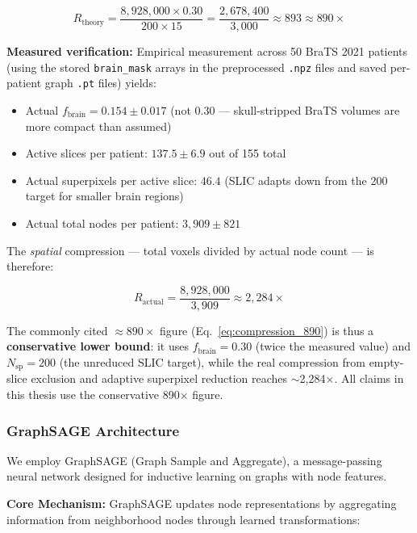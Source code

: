 \begin{equation}
R_{\text{theory}} = \frac{8{,}928{,}000 \times 0.30}{200 \times 15} = \frac{2{,}678{,}400}{3{,}000} \approx 893 \approx 890\times
\label{eq:compression_890}
\end{equation}

\textbf{Measured verification:} Empirical measurement across 50 BraTS 2021 patients (using the stored \texttt{brain\_mask} arrays in the preprocessed \texttt{.npz} files and saved per-patient graph \texttt{.pt} files) yields:

\begin{itemize}
\item Actual $f_{\text{brain}} = 0.154 \pm 0.017$ (not 0.30 — skull-stripped BraTS volumes are more compact than assumed)
\item Active slices per patient: $137.5 \pm 6.9$ out of 155 total
\item Actual superpixels per active slice: $46.4$ (SLIC adapts down from the 200 target for smaller brain regions)
\item Actual total nodes per patient: $3{,}909 \pm 821$
\end{itemize}

The \textit{spatial} compression — total voxels divided by actual node count — is therefore:

\begin{equation}
R_{\text{actual}} = \frac{8{,}928{,}000}{3{,}909} \approx 2{,}284\times
\label{eq:compression_actual}
\end{equation}

The commonly cited $\approx 890\times$ figure (Eq.~\ref{eq:compression_890}) is thus a \textbf{conservative lower bound}: it uses $f_{\text{brain}} = 0.30$ (twice the measured value) and $N_{\text{sp}} = 200$ (the unreduced SLIC target), while the real compression from empty-slice exclusion and adaptive superpixel reduction reaches $\sim$2,284$\times$. All claims in this thesis use the conservative 890$\times$ figure.

\subsubsection{GraphSAGE Architecture}

We employ GraphSAGE (Graph Sample and Aggregate), a message-passing neural network designed for inductive learning on graphs with node features.

\textbf{Core Mechanism:} GraphSAGE updates node representations by aggregating information from neighborhood nodes through learned transformations:

